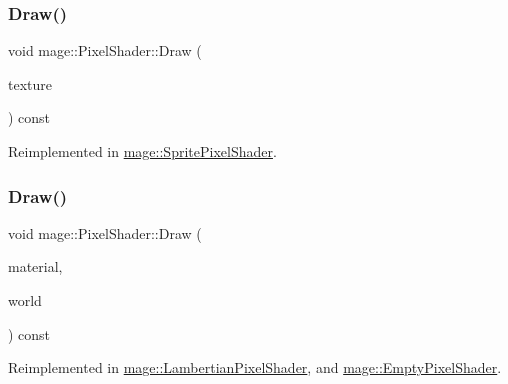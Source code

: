 \hypertarget{classmage_1_1_pixel_shader_ac9d71d866f79e155db729d8890b9ca78}{}\label{classmage_1_1_pixel_shader_ac9d71d866f79e155db729d8890b9ca78} 
\subsubsection{\texorpdfstring{Draw()}{Draw()}\hspace{0.1cm}{\footnotesize\ttfamily [2/3]}}
{\footnotesize\ttfamily void mage\+::\+Pixel\+Shader\+::\+Draw (\begin{DoxyParamCaption}\item[{I\+D3\+D11\+Shader\+Resource\+View $\ast$const $\ast$}]{texture }\end{DoxyParamCaption}) const\hspace{0.3cm}{\ttfamily [virtual]}}



Reimplemented in \hyperlink{classmage_1_1_sprite_pixel_shader_a546d7d1b50872450577db0fff8b05151}{mage\+::\+Sprite\+Pixel\+Shader}.

\hypertarget{classmage_1_1_pixel_shader_ac0506a453bf814b32aeb00819ec05806}{}\label{classmage_1_1_pixel_shader_ac0506a453bf814b32aeb00819ec05806} 
\subsubsection{\texorpdfstring{Draw()}{Draw()}\hspace{0.1cm}{\footnotesize\ttfamily [3/3]}}
{\footnotesize\ttfamily void mage\+::\+Pixel\+Shader\+::\+Draw (\begin{DoxyParamCaption}\item[{const \hyperlink{structmage_1_1_material}{Material} \&}]{material,  }\item[{const \hyperlink{classmage_1_1_world}{World} \&}]{world }\end{DoxyParamCaption}) const\hspace{0.3cm}{\ttfamily [virtual]}}



Reimplemented in \hyperlink{classmage_1_1_lambertian_pixel_shader_a7394a51578de77cd7e57b9bd63895ffd}{mage\+::\+Lambertian\+Pixel\+Shader}, and \hyperlink{classmage_1_1_empty_pixel_shader_ababff79ea9746a94b838bb2f8dfd1fbf}{mage\+::\+Empty\+Pixel\+Shader}.

